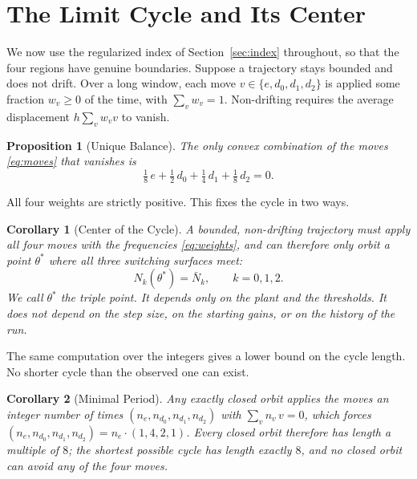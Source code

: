 \documentclass[letterpaper, 10pt, conference, twocolumn]{ieeeconf}
\newtheorem{proposition}{Proposition}
\newtheorem{corollary}{Corollary}
\newcommand{\Nbar}{\bar{N}}
\begin{document}
\section{The Limit Cycle and Its Center}
\label{sec:cycle}

We now use the regularized index of Section~\ref{sec:index} throughout, so
that the four regions have genuine boundaries. Suppose a trajectory stays
bounded and does not drift. Over a long window,
each move $v \in \{e, d_0, d_1, d_2\}$ is applied some fraction $w_v \ge 0$ of
the time, with $\sum_v w_v = 1$. Non-drifting requires the average
displacement $h \sum_v w_v v$ to vanish.

\begin{proposition}[Unique Balance]
\label{prop:balance}
The only convex combination of the moves \eqref{eq:moves} that vanishes is
\begin{equation}
\tfrac{1}{8}\, e + \tfrac{1}{2}\, d_0 + \tfrac{1}{4}\, d_1
+ \tfrac{1}{8}\, d_2 = 0.
\label{eq:weights}
\end{equation}
\end{proposition}

All four weights are strictly positive. This fixes the cycle in two ways.

\begin{corollary}[Center of the Cycle]
\label{cor:triple}
A bounded, non-drifting trajectory must apply all four moves with the
frequencies \eqref{eq:weights}, and can therefore only orbit a point
$\theta^*$ where all three switching surfaces meet:
\begin{equation}
N_k(\theta^*) = \Nbar_k, \qquad k = 0, 1, 2.
\label{eq:triplepoint}
\end{equation}
We call $\theta^*$ the \emph{triple point}. It depends only on the plant and
the thresholds. It does not depend on the step size, on the starting gains, or
on the history of the run.
\end{corollary}

The same computation over the integers gives a lower bound on the cycle
length. No shorter cycle than the observed one can exist.

\begin{corollary}[Minimal Period]
\label{cor:period}
Any exactly closed orbit applies the moves an integer number of times
$(n_e, n_{d_0}, n_{d_1}, n_{d_2})$ with $\sum_v n_v\, v = 0$, which forces
$(n_e, n_{d_0}, n_{d_1}, n_{d_2}) = n_e \cdot (1, 4, 2, 1)$. Every closed
orbit therefore has length a multiple of $8$; the shortest possible cycle
has length exactly $8$, and no closed orbit can avoid any of the four moves.
\end{corollary}
\end{document}
